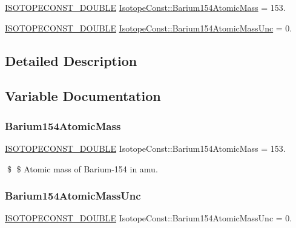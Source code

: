 \begin{DoxyCompactItemize}
\item 
\mbox{\hyperlink{group___isotope_const-_macros_ga8f45a7272ce02c0b4c65c44636ed719a}{I\+S\+O\+T\+O\+P\+E\+C\+O\+N\+S\+T\+\_\+\+D\+O\+U\+B\+LE}} \mbox{\hyperlink{group___isotope_const-_barium-_ba154_gaf9f7ca0c67f6598dd015bf68aa3c44c2}{Isotope\+Const\+::\+Barium154\+Atomic\+Mass}} = 153.
\item 
\mbox{\hyperlink{group___isotope_const-_macros_ga8f45a7272ce02c0b4c65c44636ed719a}{I\+S\+O\+T\+O\+P\+E\+C\+O\+N\+S\+T\+\_\+\+D\+O\+U\+B\+LE}} \mbox{\hyperlink{group___isotope_const-_barium-_ba154_ga031564e756386f5120cb742a8f8428c2}{Isotope\+Const\+::\+Barium154\+Atomic\+Mass\+Unc}} = 0.
\end{DoxyCompactItemize}


\subsection{Detailed Description}


\subsection{Variable Documentation}
\mbox{\label{group___isotope_const-_barium-_ba154_gaf9f7ca0c67f6598dd015bf68aa3c44c2}} 
\subsubsection{\texorpdfstring{Barium154\+Atomic\+Mass}{Barium154AtomicMass}}
{\footnotesize\ttfamily \mbox{\hyperlink{group___isotope_const-_macros_ga8f45a7272ce02c0b4c65c44636ed719a}{I\+S\+O\+T\+O\+P\+E\+C\+O\+N\+S\+T\+\_\+\+D\+O\+U\+B\+LE}} Isotope\+Const\+::\+Barium154\+Atomic\+Mass = 153.}

\$ \$ Atomic mass of Barium-\/154 in amu. \mbox{\label{group___isotope_const-_barium-_ba154_ga031564e756386f5120cb742a8f8428c2}} 
\subsubsection{\texorpdfstring{Barium154\+Atomic\+Mass\+Unc}{Barium154AtomicMassUnc}}
{\footnotesize\ttfamily \mbox{\hyperlink{group___isotope_const-_macros_ga8f45a7272ce02c0b4c65c44636ed719a}{I\+S\+O\+T\+O\+P\+E\+C\+O\+N\+S\+T\+\_\+\+D\+O\+U\+B\+LE}} Isotope\+Const\+::\+Barium154\+Atomic\+Mass\+Unc = 0.}

